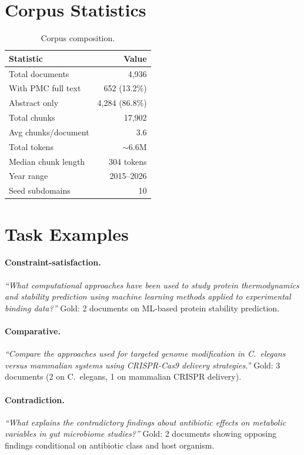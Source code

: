 \documentclass{article}
\begin{document}
\section{Corpus Statistics}
\label{app:corpus}

\begin{table}[ht]
\centering
\caption{Corpus composition.}
\small
\begin{tabular}{lr}
\toprule
\textbf{Statistic} & \textbf{Value} \\
\midrule
Total documents & 4,936 \\
With PMC full text & 652 (13.2\%) \\
Abstract only & 4,284 (86.8\%) \\
Total chunks & 17,902 \\
Avg chunks/document & 3.6 \\
Total tokens & ${\sim}$6.6M \\
Median chunk length & 304 tokens \\
Year range & 2015--2026 \\
Seed subdomains & 10 \\
\bottomrule
\end{tabular}
\end{table}

\section{Task Examples}
\label{app:examples}

\paragraph{Constraint-satisfaction.}
\emph{``What computational approaches have been used to study protein thermodynamics and stability prediction using machine learning methods applied to experimental binding data?''}
Gold: 2 documents on ML-based protein stability prediction.

\paragraph{Comparative.}
\emph{``Compare the approaches used for targeted genome modification in C.\ elegans versus mammalian systems using CRISPR-Cas9 delivery strategies.''}
Gold: 3 documents (2 on C.\ elegans, 1 on mammalian CRISPR delivery).

\paragraph{Contradiction.}
\emph{``What explains the contradictory findings about antibiotic effects on metabolic variables in gut microbiome studies?''}
Gold: 2 documents showing opposing findings conditional on antibiotic class and host organism.
\end{document}
